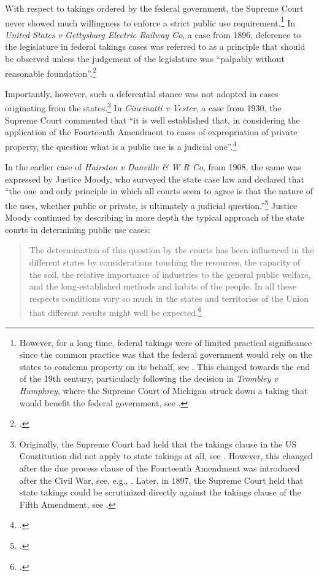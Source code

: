 With respect to takings ordered by the federal government, the Supreme Court never showed much willingness to enforce a strict public use requirement.\footnote{However, for a long time, federal takings were of limited practical significance since the common practice was that the federal government would rely on the states to condemn property on its behalf, see \cite[30]{meidinger80}. This changed towards the end of the 19th century, particularly following the decision in {\it Trombley v Humphrey}, where the Supreme Court of Michigan struck down a taking that would benefit the federal government, see \cite{trombley71}.} In {\it United States v Gettysburg Electric Railway Co}, a case from 1896, deference to the legislature in federal takings cases was referred to as a principle that should be observed unless the judgement of the legislature was ``palpably without reasonable foundation''.\footcite[680]{gettysburg96}

Importantly, however, such a deferential stance was not adopted in cases originating from the states.\footnote{Originally, the Supreme Court had held that the takings clause in the US Constitution did not apply to state takings at all, see \cite{barron33}. However, this changed after the due process clause of the Fourteenth Amendment was introduced after the Civil War, see, e.g., \cite{head85}. Later, in 1897, the Supreme Court held that state takings could be scrutinized directly against the takings clause of the Fifth Amendment, see \cite{chicago97}.} In {\it Cincinatti v Vester}, a case from 1930, the Supreme Court commented that ``it is well established that, in considering the application of the Fourteenth Amendment to cases of expropriation of private property, the question what is a public use is a judicial one''.\footcite[447]{vester30}

In the earlier case of {\it Hairston v Danville \& W R Co}, from 1908, the same was expressed by Justice Moody, who surveyed the state case law and declared that ``the one and only principle in which all courts seem to agree is that the nature of the uses, whether public or private, is ultimately a judicial question.''\footcite[606]{hairston08} Justice Moody continued by describing in more depth the typical approach of the state courts in determining public use cases:

\begin{quote}
The determination of this question by the courts has been influenced in the different states by considerations touching the resources, the capacity of the soil, the relative importance of industries to the general public welfare, and the long-established methods and habits of the people. In all these respects conditions vary so much in the states and territories of the Union that different results might well be expected.\footcite[606]{hairston08}
\end{quote}

